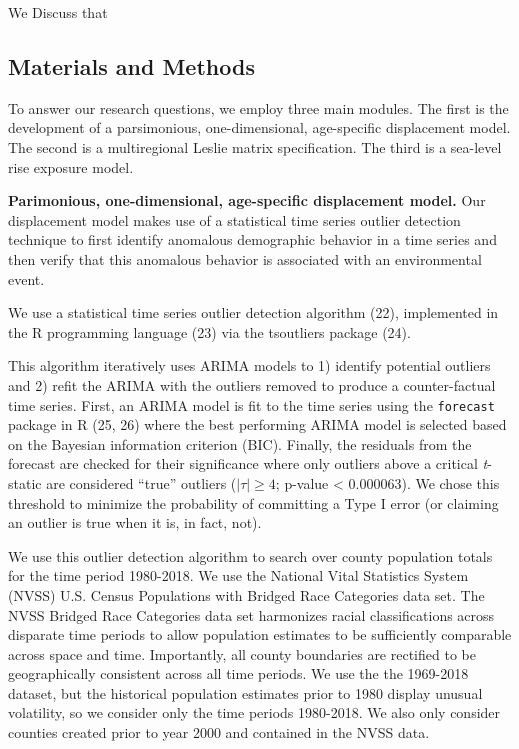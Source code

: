 \documentclass[9pt,twocolumn,twoside,]{pnas-new}
\begin{document}
We Discuss that

\hypertarget{format}{%
\subsection*{Materials and Methods}\label{format}}

To answer our research questions, we employ three main modules. The
first is the development of a parsimonious, one-dimensional,
age-specific displacement model. The second is a multiregional Leslie
matrix specification. The third is a sea-level rise exposure model.

\textbf{Parimonious, one-dimensional, age-specific displacement model.}
Our displacement model makes use of a statistical time series outlier
detection technique to first identify anomalous demographic behavior in
a time series and then verify that this anomalous behavior is associated
with an environmental event.

We use a statistical time series outlier detection algorithm (22),
implemented in the R programming language (23) via the tsoutliers
package (24).

This algorithm iteratively uses ARIMA models to 1) identify potential
outliers and 2) refit the ARIMA with the outliers removed to produce a
counter-factual time series. First, an ARIMA model is fit to the time
series using the \texttt{forecast} package in R (25, 26) where the best
performing ARIMA model is selected based on the Bayesian information
criterion (BIC). Finally, the residuals from the forecast are checked
for their significance where only outliers above a critical
\emph{t}-static are considered ``true'' outliers (\(|\tau| \geq 4\);
p-value \textless{} 0.000063). We chose this threshold to minimize the
probability of committing a Type I error (or claiming an outlier is true
when it is, in fact, not).

We use this outlier detection algorithm to search over county population
totals for the time period 1980-2018. We use the National Vital
Statistics System (NVSS) U.S. Census Populations with Bridged Race
Categories data set. The NVSS Bridged Race Categories data set
harmonizes racial classifications across disparate time periods to allow
population estimates to be sufficiently comparable across space and
time. Importantly, all county boundaries are rectified to be
geographically consistent across all time periods. We use the the
1969-2018 dataset, but the historical population estimates prior to 1980
display unusual volatility, so we consider only the time periods
1980-2018. We also only consider counties created prior to year 2000 and
contained in the NVSS data.
\end{document}
